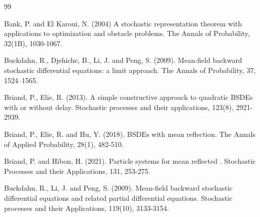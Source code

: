\documentclass[10pt]{article}%
\numberwithin{equation}{section}
\begin{document}
\fi






\begin{thebibliography}{99} 

 Bank, P. and El Karoui, N. (2004) A stochastic representation theorem with applications to optimization and obstacle problems. The Annals of Probability, 32(1B), 1030-1067.



 Buckdahn, R., Djehiche, B., Li, J. and Peng, S. (2009). Mean-field backward stochastic differential equations: a limit approach. The Annals of Probability, 37, 1524–1565.

 Briand, P., Elie, R. (2013). A simple constructive approach to quadratic BSDEs with or without delay. Stochastic processes and their applications, 123(8), 2921-2939.

  Briand, P., Elie, R. and Hu, Y. (2018). $\text{BSDEs}$ with mean reflection. The Annals of Applied Probability, 28(1), 482-510.


  Briand, P. and Hibon, H. (2021). Particle systems for mean reflected . Stochastic Processes and their Applications, 131, 253-275.


 Buckdahn, R., Li, J. and Peng, S. (2009). Mean-field backward stochastic differential equations and related partial differential equations. Stochastic processes and their Applications, 119(10), 3133-3154.





\end{thebibliography}
\end{document}
